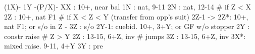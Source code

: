 (1X)- 1Y -(P/X)- 
XX : 10+, near bal
1N : nat, 9-11
2N : nat, 12-14
# if Z < X
2Z : 10+, nat F1
# if X < Z < Y (transfer from opp's suit)
2Z-1 -> 2Z*: 10+, nat F1; or s/o in Z
     - 3Z : s/o
2Y-1: cuebid. 10+, 3+Y; or GF w/o stopper
2Y : constr raise
# Z > Y
2Z : 13-15, 6+Z, inv
# jumps
3Z : 13-15, 6+Z, inv
3X*: mixed raise. 9-11, 4+Y
3Y : pre